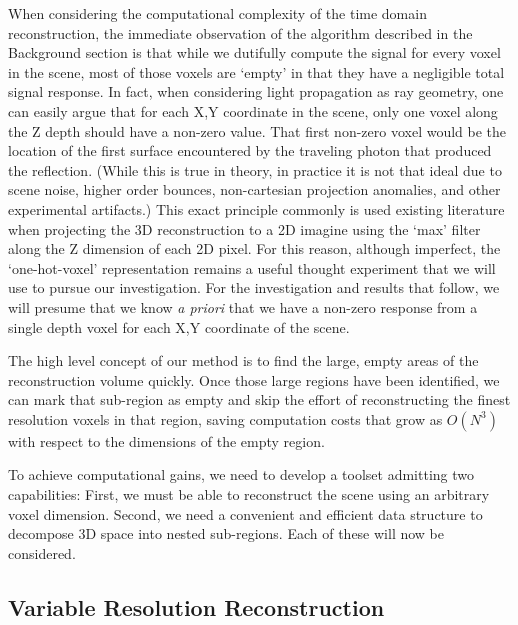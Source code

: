 \documentclass[conference]{IEEEtran}
\begin{document}
When considering the computational complexity of the time domain reconstruction, the immediate    observation of the algorithm described in the Background section is that while we dutifully compute the signal for every voxel in the scene, most of those voxels are `empty' in that they have a negligible total signal response.  In fact, when considering light propagation as ray geometry, one can easily argue that for each X,Y coordinate in the scene, only one voxel along the Z depth should have a non-zero value. That first non-zero voxel would be the location of the first surface encountered by the traveling photon that produced the reflection. (While this is true in theory, in practice it is not that ideal due to scene noise, higher order bounces, non-cartesian projection anomalies, and other experimental artifacts.) This exact principle commonly is used existing literature when projecting the 3D reconstruction to a 2D imagine using the `max' filter along the Z dimension of each 2D pixel. For this reason, although imperfect, the `one-hot-voxel' representation remains a useful thought experiment that we will use to pursue our investigation. For the investigation and results that follow, we will presume that we know \textit{a priori} that we have a non-zero response from a single depth voxel for each X,Y coordinate of the scene.

The high level concept of our method is to find the large, empty areas of the reconstruction volume quickly. Once those large regions have been identified, we can mark that sub-region as empty and skip the effort of reconstructing the finest resolution voxels in that region, saving computation costs that grow as $O(N^3)$ with respect to the dimensions of the empty region.

To achieve computational gains, we need to develop a toolset admitting two capabilities: First, we must be able to reconstruct the scene using an arbitrary voxel dimension. Second, we need a convenient and efficient data structure to decompose 3D space into nested sub-regions. Each of these will now be considered.

\subsection{Variable Resolution Reconstruction}
\end{document}
